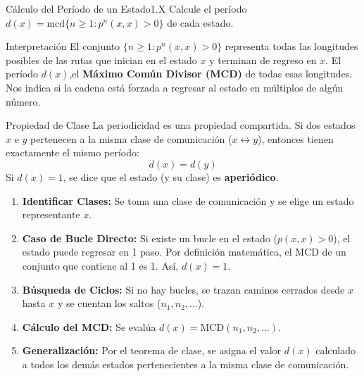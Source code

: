 \documentclass[10pt,a4paper]{article}
\begin{document}
\newpage

\begin{ejercicio}{Cálculo del Período de un Estado}{1.X}
    Calcule el período $d(x) = \text{mcd}\{n \geq 1 : p^n(x,x) > 0\}$ de cada estado.
\end{ejercicio}

\vspace{5mm}

\begin{nota}{Interpretación}
    El conjunto $\{n \geq 1 : p^n(x,x) > 0\}$ representa todas las longitudes posibles de las rutas que inician en el estado $x$ y terminan de regreso en $x$. 
    El período $d(x)$,el \textbf{Máximo Común Divisor (MCD)} de todas esas longitudes. Nos indica si la cadena está forzada a regresar al estado en múltiplos de algún número.
\end{nota}

\vspace{5mm}

\begin{mytheo}{Propiedad de Clase }{}
    La periodicidad es una propiedad compartida. Si dos estados $x$ e $y$ pertenecen a la misma clase de comunicación ($x \leftrightarrow y$), entonces tienen exactamente el mismo período:
    \[ d(x) = d(y) \]
    Si $d(x) = 1$, se dice que el estado (y su clase) es \textbf{aperiódico}.
\end{mytheo}

\vspace{5mm}


\begin{enumerate}
        \item \textbf{Identificar Clases:} Se toma una clase de comunicación y se elige un estado representante $x$.
        \item \textbf{Caso de Bucle Directo:} Si existe un bucle en el estado ($p(x,x) > 0$), el estado puede regresar en 1 paso. Por definición matemática, el MCD de un conjunto que contiene al 1 es 1. Así, $d(x) = 1$.
        \item \textbf{Búsqueda de Ciclos:} Si no hay bucles, se trazan caminos cerrados desde $x$ hasta $x$ y se cuentan los saltos ($n_1, n_2, \dots$).
        \item \textbf{Cálculo del MCD:} Se evalúa $d(x) = \text{MCD}(n_1, n_2, \dots)$.
        \item \textbf{Generalización:} Por el teorema de clase, se asigna el valor $d(x)$ calculado a todos los demás estados pertenecientes a la misma clase de comunicación.
\end{enumerate}
\end{document}

